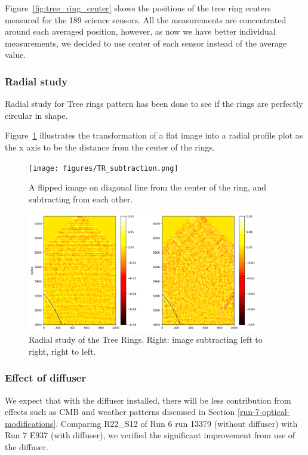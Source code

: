 Figure~\ref{fig:tree_ring_center} shows the positions of the tree ring centers measured for the 189 science sensors. All the measurements are concentrated around each averaged position, however, as now we have better individual measurements, we decided to use center of each sensor instead of the average value. 


\subsubsection{Radial study}
Radial study for Tree rings pattern has been done to see if the rings are perfectly circular in shape. 

Figure~\ref{fig:tree-ring-radial-transform} illustrates the transformation of a flat image into a radial profile plot as the x axis to be the distance from the center of the rings. 

\begin{figure}[ht]
\centering
\texttt{[image: figures/TR\_subtraction.png]}
\caption{A flipped image on diagonal line from the center of the ring, and subtracting from each other.}
\label{fig:tree-ring-radial-transform}
\end{figure}

\begin{figure}[ht]
\centering
\includegraphics[width=0.9\textwidth]{figures/TR_radial.png}
\caption{Radial study of the Tree Rings. Right: image subtracting left to right, right to left.}
\end{figure}

\subsubsection{Effect of diffuser}
We expect that with the diffuser installed, there will be less contribution from effects such as CMB and weather patterns discussed in Section \ref{run-7-optical-modifications}. Comparing R22\_S12 of Run 6 run 13379 (without diffuser) with Run 7 E937 (with diffuser), we verified the significant improvement from use of the diffuser.

